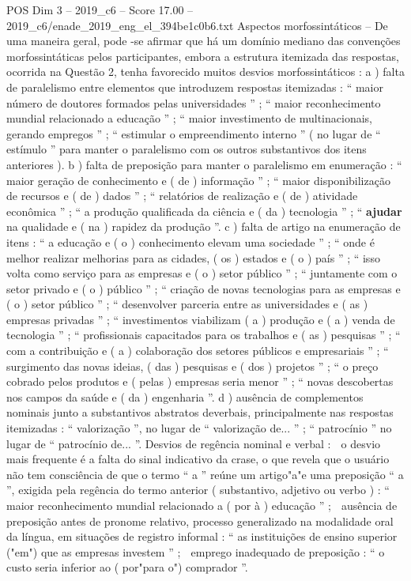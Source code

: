 \begin{textsample}{POS Dim 3 – 2019\_c6 – Score 17.00 – 2019\_c6/enade\_2019\_eng\_el\_394be1c0b6.txt}
Aspectos morfossintáticos – De uma maneira geral, pode -se afirmar que há um domínio mediano das convenções morfossintáticas pelos participantes, embora a estrutura itemizada das respostas, ocorrida na Questão 2, tenha favorecido muitos desvios morfossintáticos : a ) falta de paralelismo entre elementos que introduzem respostas itemizadas : “ maior número de doutores formados pelas universidades ” ; “ maior reconhecimento mundial relacionado a educação ” ; “ maior investimento de multinacionais, gerando empregos ” ; “ estimular o empreendimento interno ” ( no lugar de “ estímulo ” para manter o paralelismo com os outros substantivos dos itens anteriores ). b ) falta de preposição para manter o paralelismo em enumeração : “ maior geração de conhecimento e ( de ) informação ” ; “ maior disponibilização de recursos e ( de ) dados ” ; “ relatórios de realização e ( de ) atividade econômica ” ; “ a produção qualificada da ciência e ( da ) tecnologia ” ; “ \textbf{ajudar} na qualidade e ( na ) rapidez da produção ”. c ) falta de artigo na enumeração de itens : “ a educação e ( o ) conhecimento elevam uma sociedade ” ; “ onde é melhor realizar melhorias para as cidades, ( os ) estados e ( o ) país ” ; “ isso volta como serviço para as empresas e ( o ) setor público ” ; “ juntamente com o setor privado e ( o ) público ” ; “ criação de novas tecnologias para as empresas e ( o ) setor público ” ; “ desenvolver parceria entre as universidades e ( as ) empresas privadas ” ; “ investimentos viabilizam ( a ) produção e ( a ) venda de tecnologia ” ; “ profissionais capacitados para os trabalhos e ( as ) pesquisas ” ; “ com a contribuição e ( a ) colaboração dos setores públicos e empresariais ” ; “ surgimento das novas ideias, ( das ) pesquisas e ( dos ) projetos ” ; “ o preço cobrado pelos produtos e ( pelas ) empresas seria menor ” ; “ novas descobertas nos campos da saúde e ( da ) engenharia ”. d ) ausência de complementos nominais junto a substantivos abstratos deverbais, principalmente nas respostas itemizadas : “ valorização ”, no lugar de “ valorização de... ” ; “ patrocínio ” no lugar de “ patrocínio de... ”.
Desvios de regência nominal e verbal :  o desvio mais frequente é a falta do sinal indicativo da crase, o que revela que o usuário não tem consciência de que o termo “ a ” reúne um artigo"a"e uma preposição “ a ”, exigida pela regência do termo anterior ( substantivo, adjetivo ou verbo ) : “ maior reconhecimento mundial relacionado a ( por à ) educação ” ;  ausência de preposição antes de pronome relativo, processo generalizado na modalidade oral da língua, em situações de registro informal : “ as instituições de ensino superior ("em") que as empresas investem ” ;  emprego inadequado de preposição : “ o custo seria inferior ao ( por"para o") comprador ”.

\end{textsample}
